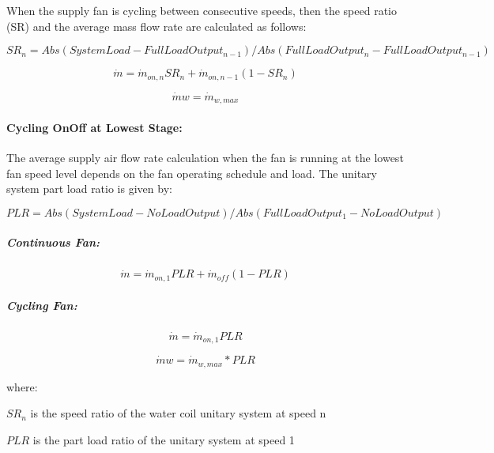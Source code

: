 When the supply fan is cycling between consecutive speeds, then the speed ratio (SR) and the average mass flow rate are calculated as follows:

\begin{equation}
  {SR_{n}} = Abs({SystemLoad} - {FullLoadOutput_{n-1}}) / Abs({FullLoadOutput_{n}} - {FullLoadOutput_{n-1}})
\end{equation}
  
\begin{equation}
  {\dot m} = {\dot m_{on, n}} {SR_{n}} + {\dot m_{on, n-1}} (1 - {SR_{n}})
\end{equation}

\begin{equation}
  {\dot m{w}} = {\dot m_{w, max}}
\end{equation}

\paragraph{Cycling OnOff at Lowest Stage:}\label{cycling-onoff-at-lowest-stage}

The average supply air flow rate calculation when the fan is running at the lowest fan speed level depends on the fan operating schedule and load. The unitary system part load ratio is given by:

\begin{equation}
{PLR} = Abs({SystemLoad} - {NoLoadOutput}) / Abs({FullLoadOutput_{1}} - {NoLoadOutput})
\end{equation}

\subparagraph{Continuous Fan:}\label{continuous-fan}

\begin{equation}
{\dot m} = {\dot m_{on, 1}} {PLR} + {\dot m_{off}} (1 - {PLR})
\end{equation}

\subparagraph{Cycling Fan:}\label{cycling-fan}

\begin{equation}
  {\dot m} = {\dot m_{on, 1}} {PLR}
\end{equation}
  
\begin{equation}
  {\dot m{w}} = {\dot m_{w, max}} * {PLR}
\end{equation}

where:

$SR_n$ is the speed ratio of the water coil unitary system at speed n

$PLR$ is the part load ratio of the unitary system at speed 1

